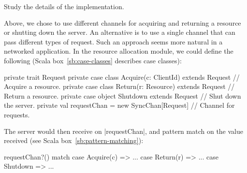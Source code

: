 \begin{instruction}
Study the details of the implementation. 
\end{instruction}

Above, we chose to use different channels for acquiring and returning a
resource or shutting down the server.  An alternative is to use a single
channel that can pass different types of request.  Such an approach seems more
natural in a networked application.  In the resource allocation module, we
could define the following (Scala box~\ref{sb:case-classes} describes case
classes):
%
\begin{scala}
  private trait Request
  private case class Acquire(c: ClientId) extends Request // Acquire a resource.
  private case class Return(r: Resource) extends Request // Return a resource.
  private case object Shutdown extends Request // Shut down the server.
  private val requestChan = new SyncChan[Request] // Channel for requests.
\end{scala}
%
The server would then receive on |requestChan|, and pattern match on the value
received (see Scala box~\ref{sb:pattern-matching}):
%
\begin{scala}
  requestChan?() match{
    case Acquire(c) => ...
    case Return(r) => ...
    case Shutdown => ...
  }
\end{scala}
